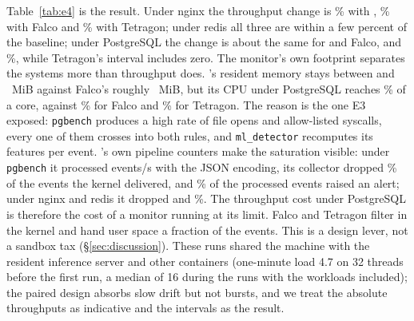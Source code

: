 Table~\ref{tab:e4} is the result. Under nginx the throughput change is
\eFourDeltaNginxWs{}\% with \sys, \eFourDeltaNginxFalco{}\% with Falco
and \eFourDeltaNginxTetragon{}\% with Tetragon; under redis all three are
within a few percent of the baseline; under PostgreSQL the change is about
the same for \sys and Falco, \eFourDeltaPgWs{} and \eFourDeltaPgFalco{}\%,
while Tetragon's interval includes zero. The
monitor's own footprint separates the systems more than throughput does.
\sys's resident memory stays between \eFourRssRedisWs{} and
\eFourRssPgWs{}~MiB against Falco's roughly \eFourRssPgFalco{}~MiB, but its
CPU under PostgreSQL reaches \eFourCpuPgWs{}\% of a core, against
\eFourCpuPgFalco{}\% for Falco and \eFourCpuPgTetragon{}\% for Tetragon.
The reason is the one E3 exposed: \texttt{pgbench} produces a high rate of
file opens and allow-listed syscalls, every one of them crosses into both
rules, and \texttt{ml\_detector} recomputes its features per event. \sys's
own pipeline counters make the saturation visible: under \texttt{pgbench}
it processed \eFourWsEpsPg{} events/s with the JSON encoding, its
collector dropped \eFourWsDroppedPctPg{}\% of the events the kernel
delivered, and \eFourWsAlertPctPg{}\% of the processed events raised an
alert; under nginx and redis it dropped \eFourWsDroppedPctNginx{} and
\eFourWsDroppedPctRedis{}\%. The throughput cost under PostgreSQL is
therefore the cost of a monitor running at its limit. Falco and Tetragon
filter in the kernel and hand user space a fraction of the events. This is
a design lever, not a sandbox tax (\S\ref{sec:discussion}). These runs shared the machine with the resident
inference server and other containers (one-minute load 4.7 on 32 threads
before the first run, a median of 16 during the runs with the workloads
included); the paired design absorbs slow drift but not bursts, and we
treat the absolute throughputs as indicative and the intervals as the
result.

\begin{table}[t]
\caption{E4: application throughput under four monitoring arms (mean of 5
interleaved runs; $\Delta$ is the paired difference to the unmonitored arm
with a 95\% CI). Monitor CPU is the monitor's own processes, in percent of
one core; RSS is the peak. Produced by \texttt{e4\_overhead.py} from
\texttt{e4/e4\_results.json}.}
\label{tab:e4}
\centering\footnotesize

\end{table}

